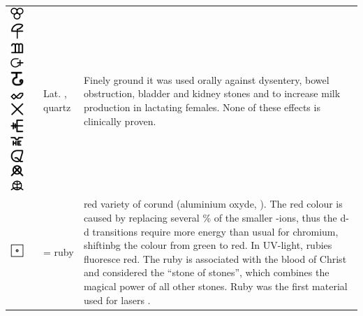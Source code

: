 \documentclass[british,final,landscape]{scrartcl}
\begin{document}
\begin{refsection}
\begin{supertabular}{p{0.3\textwidth}p{0.34\textwidth}p{0.34\textwidth}}
   \includegraphics[width=5mm]{Mineral/Quartz} \includegraphics[width=5mm]{Mineral/Crystallus} \includegraphics[width=5mm]{Mineral/Crystallus2} \includegraphics[width=5mm]{Mineral/Crystallus3} \includegraphics[width=5mm]{Mineral/Crystallus4} \includegraphics[width=5mm]{Mineral/Crystallus5} \includegraphics[width=5mm]{Mineral/Crystallus6} \includegraphics[width=5mm]{Mineral/Crystallus7} \includegraphics[width=5mm]{Mineral/Crystallus8} \includegraphics[width=5mm]{Mineral/Crystallus9} \includegraphics[width=5mm]{Mineral/Crystallus10} \includegraphics[width=5mm]{Mineral/Crystallus11} & Lat. , quartz & Finely ground it was used orally against dysentery, bowel obstruction, bladder and kidney stones and to increase milk production in lactating females. None of these effects is clinically proven. \\
   \includegraphics[width=5mm]{Mineral/Ruby}&  = ruby & red variety of corund (aluminium oxyde, ). The red colour is caused by  replacing several \si{\%} of the smaller -ions, thus the d-d transitions require more energy than usual for chromium, shiftinbg the colour from green to red. In UV-light, rubies fluoresce red. The ruby is associated with the blood of Christ and considered the ``stone of stones'', which combines the magical power of all other stones. Ruby was the first material used for lasers \parencite{Mai-60}. \\

\end{supertabular}
\end{refsection}
\end{document}
